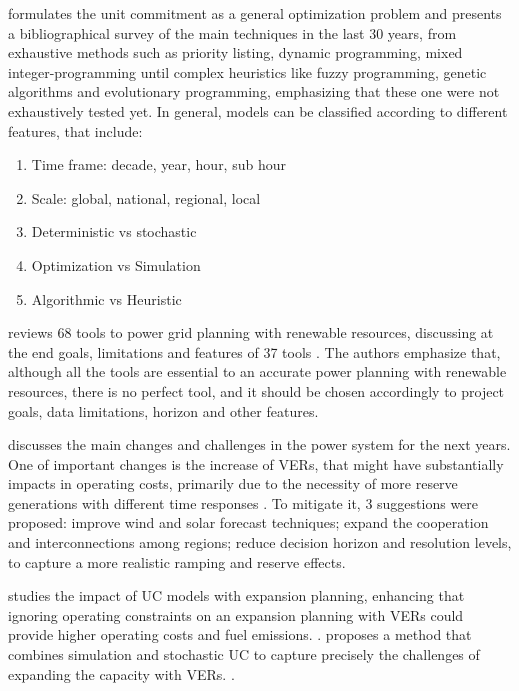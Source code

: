 \documentclass[12pt,LUDisStyle,twosided]{book}
\begin{document}
\citeauthor{padhy} formulates the unit commitment as a general optimization problem and presents a bibliographical survey of the main techniques in the last 30 years, from exhaustive methods such as priority listing, dynamic programming, mixed integer-programming until complex heuristics like fuzzy programming, genetic algorithms and evolutionary programming, emphasizing that these one were not exhaustively tested yet. In general, models can be classified according to different features, that include:

\begin{enumerate}
\item Time frame: decade, year, hour, sub hour 
\item Scale: global, national, regional, local
\item Deterministic vs stochastic
\item Optimization vs Simulation
\item Algorithmic vs Heuristic
\end{enumerate}

\citeauthor{connolly} reviews 68 tools to power grid planning with renewable resources, discussing at the end goals, limitations and features of 37 tools \cite{connolly}. The authors emphasize that, although all the tools are essential to an accurate power planning with renewable resources, there is no perfect tool, and it should be chosen accordingly to project goals, data limitations, horizon and other features. 


\citeauthor{kassakian} discusses the main changes and challenges in the power system for the next years. One of important changes is the increase of VERs, that might have substantially impacts in operating costs, primarily due to the necessity of more reserve generations with different time responses \cite{kassakian}. To mitigate it, 3 suggestions were proposed: improve wind and solar forecast techniques; expand the cooperation and interconnections among regions; reduce decision horizon and resolution levels, to capture a more realistic ramping and reserve effects.

\citeauthor{palmintier} studies the impact of UC models with expansion planning, enhancing that ignoring operating constraints on an expansion planning with VERs could provide higher operating costs and fuel emissions. \cite{palmintier}. \citeauthor{hargreaves} proposes a method that combines simulation and stochastic UC to capture precisely the challenges of expanding the capacity with VERs. \cite{hargreaves}.
\end{document}
